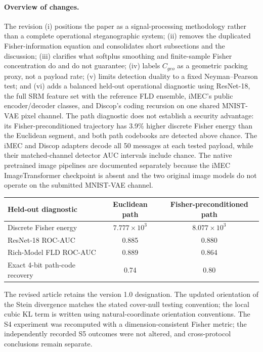 \documentclass[12pt,a4paper]{article}
\begin{document}
\paragraph{Overview of changes.}
The revision (i) positions the paper as a signal-processing methodology rather than a complete operational steganographic system; (ii) removes the duplicated Fisher-information equation and consolidates short subsections and the discussion; (iii) clarifies what softplus smoothing and finite-sample Fisher concentration do and do not guarantee; (iv) labels $C_{geo}$ as a geometric packing proxy, not a payload rate; (v) limits detection duality to a fixed Neyman--Pearson test; and (vi) adds a balanced held-out operational diagnostic using ResNet-18, the full SRM feature set with the reference FLD ensemble, iMEC's public encoder/decoder classes, and Discop's coding recursion on one shared MNIST-VAE pixel channel. The path diagnostic does not establish a security advantage: its Fisher-preconditioned trajectory has 3.9\% higher discrete Fisher energy than the Euclidean segment, and both path codebooks are detected above chance. The iMEC and Discop adapters decode all 50 messages at each tested payload, while their matched-channel detector AUC intervals include chance. The native pretrained image pipelines are documented separately because the iMEC ImageTransformer checkpoint is absent and the two original image models do not operate on the submitted MNIST-VAE channel.

\begin{center}
\begin{tabular}{lcc}
\toprule
\textbf{Held-out diagnostic} & \textbf{Euclidean path} & \textbf{Fisher-preconditioned path} \\
\midrule
Discrete Fisher energy & $7.777\times10^3$ & $8.077\times10^3$ \\
ResNet-18 ROC-AUC & 0.885 & 0.880 \\
Rich-Model FLD ROC-AUC & 0.889 & 0.864 \\
Exact 4-bit path-code recovery & 0.74 & 0.80 \\
\bottomrule
\end{tabular}
\end{center}

The revised article retains the version 1.0 designation. The updated orientation of the Stein divergence matches the stated cover-null testing convention; the local cubic KL term is written using natural-coordinate orientation conventions. The S4 experiment was recomputed with a dimension-consistent Fisher metric; the independently recorded S5 outcomes were not altered, and cross-protocol conclusions remain separate.
\end{document}
